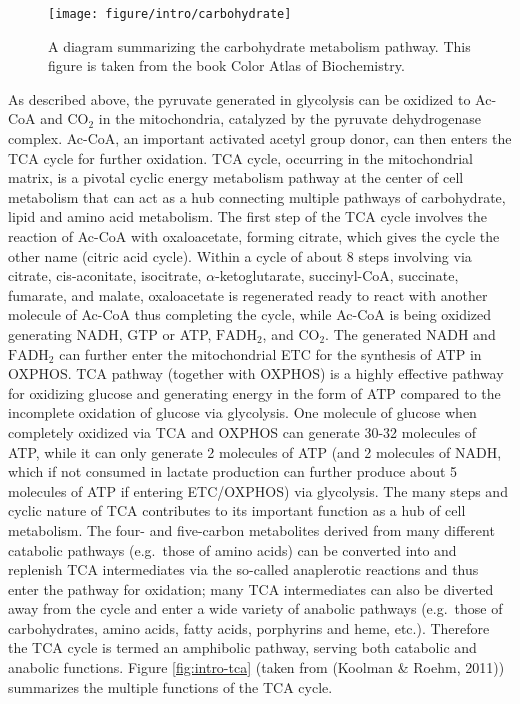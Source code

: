 \documentclass[12pt,twoside,openany,\mydriver]{thesis}  %
\begin{document}
\begin{figure}
\texttt{[image: figure/intro/carbohydrate]} \caption{A diagram summarizing the carbohydrate metabolism pathway. This figure is taken from the book Color Atlas of Biochemistry.}\label{fig:intro-carbohydrate}
\end{figure}
As described above, the pyruvate generated in glycolysis can be oxidized to Ac-CoA and \(\mathrm{CO_2}\) in the mitochondria, catalyzed by the pyruvate dehydrogenase complex. Ac-CoA, an important activated acetyl group donor, can then enters the TCA cycle for further oxidation. TCA cycle, occurring in the mitochondrial matrix, is a pivotal cyclic energy metabolism pathway at the center of cell metabolism that can act as a hub connecting multiple pathways of carbohydrate, lipid and amino acid metabolism. The first step of the TCA cycle involves the reaction of Ac-CoA with oxaloacetate, forming citrate, which gives the cycle the other name (citric acid cycle). Within a cycle of about 8 steps involving via citrate, cis-aconitate, isocitrate, \(\alpha\)-ketoglutarate, succinyl-CoA, succinate, fumarate, and malate, oxaloacetate is regenerated ready to react with another molecule of Ac-CoA thus completing the cycle, while Ac-CoA is being oxidized generating NADH, GTP or ATP, \(\mathrm{FADH_2}\), and \(\mathrm{CO_2}\). The generated NADH and \(\mathrm{FADH_2}\) can further enter the mitochondrial ETC for the synthesis of ATP in OXPHOS. TCA pathway (together with OXPHOS) is a highly effective pathway for oxidizing glucose and generating energy in the form of ATP compared to the incomplete oxidation of glucose via glycolysis. One molecule of glucose when completely oxidized via TCA and OXPHOS can generate 30-32 molecules of ATP, while it can only generate 2 molecules of ATP (and 2 molecules of NADH, which if not consumed in lactate production can further produce about 5 molecules of ATP if entering ETC/OXPHOS) via glycolysis. The many steps and cyclic nature of TCA contributes to its important function as a hub of cell metabolism. The four- and five-carbon metabolites derived from many different catabolic pathways (e.g.~those of amino acids) can be converted into and replenish TCA intermediates via the so-called anaplerotic reactions and thus enter the pathway for oxidation; many TCA intermediates can also be diverted away from the cycle and enter a wide variety of anabolic pathways (e.g.~those of carbohydrates, amino acids, fatty acids, porphyrins and heme, etc.). Therefore the TCA cycle is termed an amphibolic pathway, serving both catabolic and anabolic functions. Figure \ref{fig:intro-tca} (taken from (Koolman \& Roehm, 2011)) summarizes the multiple functions of the TCA cycle.
\end{document}

